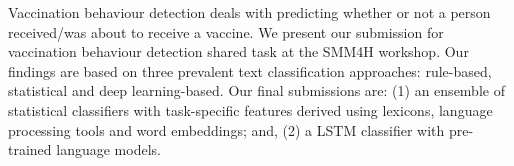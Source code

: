 Vaccination behaviour detection deals with predicting whether or not a person received/was about to receive a vaccine. We present our submission for vaccination behaviour detection shared task at the SMM4H workshop. Our findings are based on three prevalent text classification approaches:  rule-based, statistical and deep learning-based. Our final submissions are: (1) an ensemble of statistical classifiers with task-specific features derived using lexicons, language processing tools and word embeddings; and, (2) a LSTM classifier with pre-trained language models.
